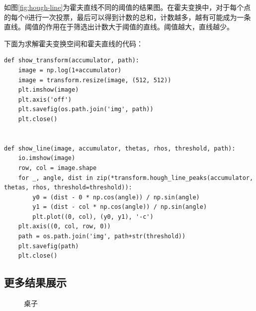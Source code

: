 \documentclass{article}
\begin{document}
如图\ref{fig:hough-line}为霍夫直线不同的阈值的结果图。在霍夫变换中，对于每个点的每个$\theta$进行一次投票，最后可以得到计数的总和，计数越多，越有可能成为一条直线。阈值的作用在于筛选出计数大于阈值的直线。阈值越大，直线越少。

下面为求解霍夫变换空间和霍夫直线的代码：

\begin{lstlisting}[title={hough space and hough line}]
def show_transform(accumulator, path):
    image = np.log(1+accumulator)
    image = transform.resize(image, (512, 512))
    plt.imshow(image)
    plt.axis('off')
    plt.savefig(os.path.join('img', path))
    plt.close()


def show_line(image, accumulator, thetas, rhos, threshold, path):
    io.imshow(image)
    row, col = image.shape
    for _, angle, dist in zip(*transform.hough_line_peaks(accumulator, thetas, rhos, threshold=threshold)):
        y0 = (dist - 0 * np.cos(angle)) / np.sin(angle)
        y1 = (dist - col * np.cos(angle)) / np.sin(angle)
        plt.plot((0, col), (y0, y1), '-c')
    plt.axis((0, col, row, 0))
    path = os.path.join('img', path+str(threshold))
    plt.savefig(path)
    plt.close()
\end{lstlisting}

\subsection{更多结果展示}

\begin{figure}[ht]
	\centering
	\quad
	\caption{桌子}
	\label{fig:desk}
\end{figure}
\end{document}
